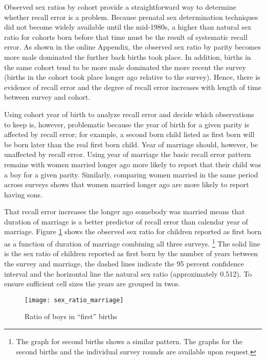 \documentclass[12pt,letterpaper]{article}
\begin{document}
Observed sex ratios by cohort provide a straightforward way to determine 
whether recall error is a problem.
Because prenatal sex determination techniques did not become widely available until the 
mid-1980s, a higher than natural sex ratio for cohorts born before that time must be 
the result of systematic recall error.
As shown in the online Appendix, the observed sex ratio by parity becomes more male 
dominated the further back births took place.
In addition, births in the same cohort tend to be more male dominated the more recent the 
survey (births in the cohort took place longer ago relative to the survey).
Hence, there is evidence of recall error and the degree of recall error increases
with length of time between survey and cohort.

Using cohort year of birth to analyze recall error and decide which observations
to keep is, however, problematic because the year of birth for a given parity is affected 
by recall error; for example, a second born child listed as first born will be 
born later than the real first born child.
Year of marriage should, however, be unaffected by recall error.
Using year of marriage the basic recall error pattern remains with women married longer 
ago more likely to report that their child was a boy for a given parity.
Similarly, comparing women married in the same period across surveys shows
that women married longer ago are more likely to report having sons.

That recall error increases the longer ago somebody was married means
that duration of marriage is a better predictor of recall error than calendar year of 
marriage.
Figure \ref{fig:sexRatioMarriage} shows the observed sex ratio for children 
reported as first born as a function of duration of marriage combining all three surveys.%
\footnote{
The graph for second births shows a similar pattern.
The graphs for the second births and the individual survey rounds are available upon request.
}
The solid line is the sex ratio of children reported 
as first born by the number of years between the survey and marriage, 
the dashed lines indicate the 95 percent confidence interval 
and the horizontal line the natural sex ratio (approximately 0.512).
To ensure sufficient cell sizes the years are grouped in twos.

\begin{figure}[htp]%
\centering
\texttt{[image: sex\_ratio\_marriage]}
\caption{Ratio of boys in ``first'' births}
\label{fig:sexRatioMarriage}
\end{figure}
\end{document}
